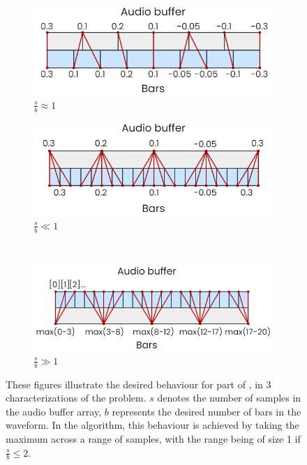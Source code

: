 \documentclass[12pt,a4paper,oneside,openright]{report}
\begin{document}
\begin{figure}[h]
\centering
\begin{subfigure}{.5\textwidth}
  \centering
  \includegraphics[width=\linewidth]{images/waveform_range_diagram_a.png}
  \caption{$\frac{s}{b} \approx 1$}
  \label{fig:waveform_range_a}
\end{subfigure}%
\begin{subfigure}{.5\textwidth}
  \centering
  \includegraphics[width=\linewidth]{images/waveform_range_diagram_b.png}
  \caption{$\frac{s}{b} \ll 1$}
  \label{fig:waveform_range_b}
\end{subfigure}\\[1ex]
\begin{subfigure}{\textwidth}
  \centering
  \includegraphics[width=.6\linewidth]{images/waveform_range_diagram_c.png}
  \caption{$\frac{s}{b} \gg 1$}
  \label{fig:waveform_range_c}
\end{subfigure}
\caption{These figures illustrate the desired behaviour for part of , in 3 characterizations of the problem. $s$ denotes the number of samples in the audio buffer array, $b$ represents the desired number of bars in the waveform. In the algorithm, this behaviour is achieved by taking the maximum across a range of samples, with the range being of size 1 if $\frac{s}{b}\le 2$.}
\label{fig:waveform_range}
\end{figure}
\end{document}
